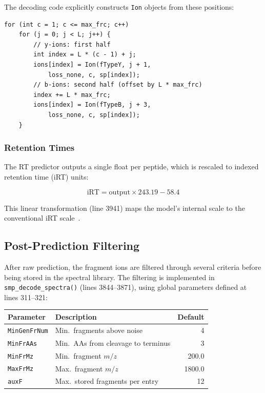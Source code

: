 \documentclass[11pt,a4paper]{article}
\begin{document}
The decoding code explicitly constructs \texttt{Ion} objects from these positions:

\begin{lstlisting}[caption={Fragment ion decoding (lines 3843--3855)}]
for (int c = 1; c <= max_frc; c++)
    for (j = 0; j < L; j++) {
        // y-ions: first half
        int index = L * (c - 1) + j;
        ions[index] = Ion(fTypeY, j + 1,
            loss_none, c, sp[index]);
        // b-ions: second half (offset by L * max_frc)
        index += L * max_frc;
        ions[index] = Ion(fTypeB, j + 3,
            loss_none, c, sp[index]);
    }
\end{lstlisting}

\subsubsection{Retention Times}

The RT predictor outputs a single float per peptide, which is rescaled to indexed retention time (iRT) units:

\begin{equation}
\text{iRT} = \text{output} \times 243.19 - 58.4
\label{eq:rt-rescale}
\end{equation}

This linear transformation (line 3941) maps the model's internal scale to the conventional iRT scale~\cite{escher2012}.

\subsection{Post-Prediction Filtering}
\label{sec:filtering}

After raw prediction, the fragment ions are filtered through several criteria before being stored in the spectral library. The filtering is implemented in \texttt{smp\_decode\_spectra()} (lines 3844--3871), using global parameters defined at lines 311--321:

\begin{center}
\begin{tabular}{llr}
\toprule
\textbf{Parameter} & \textbf{Description} & \textbf{Default} \\
\midrule
\texttt{MinGenFrNum} & Min.\ fragments above noise & 4 \\
\texttt{MinFrAAs} & Min.\ AAs from cleavage to terminus & 3 \\
\texttt{MinFrMz} & Min.\ fragment $m/z$ & 200.0 \\
\texttt{MaxFrMz} & Max.\ fragment $m/z$ & 1800.0 \\
\texttt{auxF} & Max.\ stored fragments per entry & 12 \\
\bottomrule
\end{tabular}
\end{center}
\end{document}
